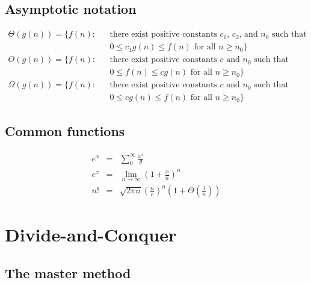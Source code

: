 \documentclass[12pt]{article}
\begin{document}
\subsection{Asymptotic notation}

\begin{eqnarray*}
  \Theta (g(n)) = \{ f(n): && \text{there exist positive constants
    $c_1$, $c_2$, and $n_0$ such that} \\
  && 0 \le c_1 g(n) \le f(n) \text{ for all } n \ge n_0 \} \\
  O(g(n)) = \{ f(n): && \text{there exist positive constants
    $c$ and $n_0$ such that} \\
  && 0 \le f(n) \le cg(n) \text{ for all } n \ge n_0 \} \\
  \Omega (g(n)) = \{ f(n): && \text{there exist positive constants
    $c$ and $n_0$ such that} \\
  && 0 \le cg(n) \le f(n) \text{ for all } n \ge n_0 \}
\end{eqnarray*}

\subsection{Common functions}

\begin{eqnarray*}
  e^x &=& \sum_0^{\infty} \frac {x^i}{i!} \\
  e^x &=& \lim_{n \rightarrow \infty} (1 + \frac {x}{n})^n \\
  n!  &=& \sqrt {2 \pi n} \left(\frac {n}{e} \right)^n 
          \left( 1 + \Theta \left( \frac {1}{n} \right) \right)
\end{eqnarray*}

\section{Divide-and-Conquer}

\subsection{The master method}
\end{document}

